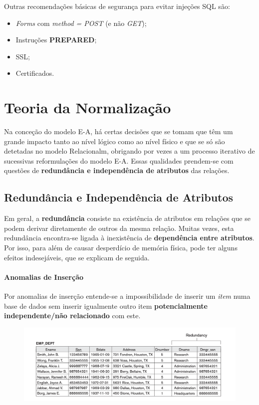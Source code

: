 \documentclass[oneside]{book}
\theoremstyle{definition}
\begin{document}
Outras recomendações básicas de segurança para evitar injeções SQL são:
\begin{itemize}
    \itemsep 0cm
    \item \textit{Forms} com \textit{method = POST} (e não \textit{GET});
    \item Instruções \textbf{PREPARED};
    \item SSL;
    \item Certificados.
\end{itemize}

\chapter{Teoria da Normalização}

Na conceção do modelo E-A, há certas decisões que se tomam que têm um grande impacto tanto ao nível lógico como ao nível físico e que se só são detetadas no modelo Relacionalm, obrigando por vezes a um processo iterativo de sucessivas reformulações do modelo E-A. Essas qualidades prendem-se com questões de \textbf{redundância e independência de atributos} das relações.

\section{Redundância e Independência de Atributos}

Em geral, a \textbf{redundância} consiste na existência de atributos em relações que se podem derivar diretamente de outros da mesma relação. Muitas vezes, esta redundância encontra-se ligada à inexistência de \textbf{dependência entre atributos}. Por isso, para além de causar desperdício de memória física, pode ter alguns efeitos indesejáveis, que se explicam de seguida.

\subsubsection{Anomalias de Inserção}

Por anomalias de inserção entende-se a impossibilidade de inserir um \textit{item} numa base de dados sem inserir igualmente outro item \textbf{potencialmente independente/não relacionado} com este.
\vspace{-0.3em}
\begin{figure}[H]
    \centering
    \includegraphics[scale = 0.6]{cap_norm/tabela_redundancia.png}
\end{figure}
\end{document}
